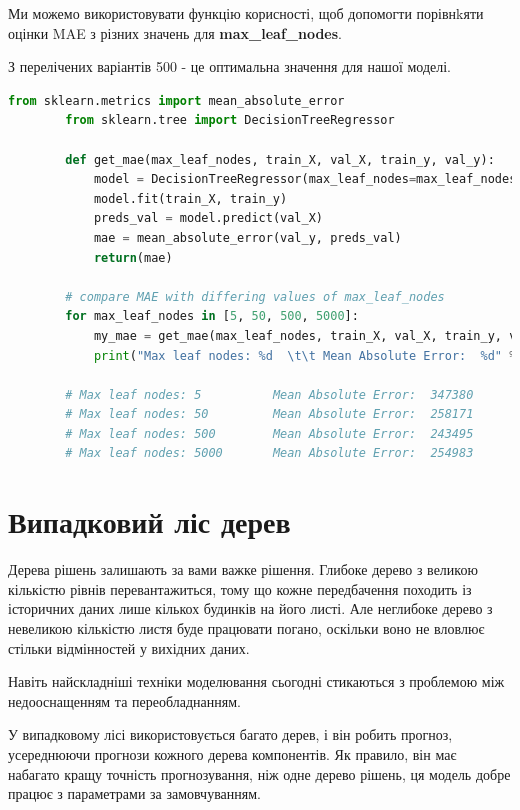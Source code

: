 \documentclass[11pt]{article}
\begin{document}
    Ми можемо використовувати функцію корисності, щоб допомогти порівнkяти оцінки MAE з різних значень для \textbf{max\_leaf\_nodes}.

    З перелічених варіантів 500 - це оптимальна значення для нашої моделі.

    \begin{lstlisting}[style=light, language=Python,label={lst:vectorimg},caption=Computing MAE for different value of leaf nodes]
        from sklearn.metrics import mean_absolute_error
        from sklearn.tree import DecisionTreeRegressor

        def get_mae(max_leaf_nodes, train_X, val_X, train_y, val_y):
            model = DecisionTreeRegressor(max_leaf_nodes=max_leaf_nodes, random_state=0)
            model.fit(train_X, train_y)
            preds_val = model.predict(val_X)
            mae = mean_absolute_error(val_y, preds_val)
            return(mae)

        # compare MAE with differing values of max_leaf_nodes
        for max_leaf_nodes in [5, 50, 500, 5000]:
            my_mae = get_mae(max_leaf_nodes, train_X, val_X, train_y, val_y)
            print("Max leaf nodes: %d  \t\t Mean Absolute Error:  %d" %(max_leaf_nodes, my_mae))

        # Max leaf nodes: 5  		 Mean Absolute Error:  347380
        # Max leaf nodes: 50  		 Mean Absolute Error:  258171
        # Max leaf nodes: 500  		 Mean Absolute Error:  243495
        # Max leaf nodes: 5000       Mean Absolute Error:  254983
    \end{lstlisting}


    \section{Випадковий ліс дерев}\label{sec:random_forest_tree}
    Дерева рішень залишають за вами важке рішення.
    Глибоке дерево з великою кількістю рівнів перевантажиться, тому що кожне передбачення походить із історичних даних лише кількох будинків на його листі.
    Але неглибоке дерево з невеликою кількістю листя буде працювати погано, оскільки воно не вловлює стільки відмінностей у вихідних даних.

    Навіть найскладніші техніки моделювання сьогодні стикаються з проблемою між недооснащенням та переобладнанням.

    У випадковому лісі використовується багато дерев, і він робить прогноз, усереднюючи прогнози кожного дерева компонентів.
    Як правило, він має набагато кращу точність прогнозування, ніж одне дерево рішень, ця модель добре працює з параметрами за замовчуванням.
\end{document}
